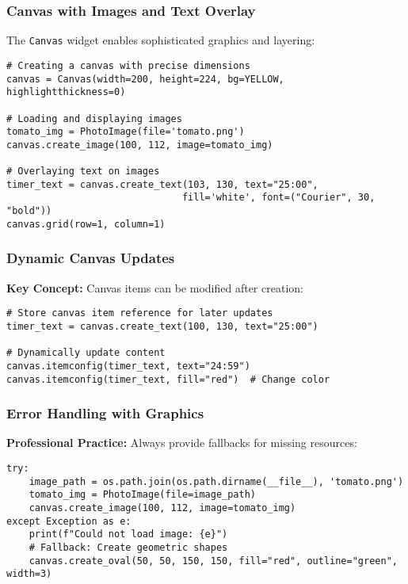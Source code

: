 \documentclass[12pt,a4paper]{article}
\begin{document}
\subsubsection{Canvas with Images and Text Overlay}
The \texttt{Canvas} widget enables sophisticated graphics and layering:

\begin{tcolorbox}[colback=blue!5!white,colframe=blue!75!black,title=Canvas with Images and Text]
\begin{lstlisting}
# Creating a canvas with precise dimensions
canvas = Canvas(width=200, height=224, bg=YELLOW, highlightthickness=0)

# Loading and displaying images
tomato_img = PhotoImage(file='tomato.png')
canvas.create_image(100, 112, image=tomato_img)

# Overlaying text on images
timer_text = canvas.create_text(103, 130, text="25:00", 
                               fill='white', font=("Courier", 30, "bold"))
canvas.grid(row=1, column=1)
\end{lstlisting}
\end{tcolorbox}

\subsubsection{Dynamic Canvas Updates}
\textbf{Key Concept:} Canvas items can be modified after creation:

\begin{lstlisting}
# Store canvas item reference for later updates
timer_text = canvas.create_text(100, 130, text="25:00")

# Dynamically update content
canvas.itemconfig(timer_text, text="24:59")
canvas.itemconfig(timer_text, fill="red")  # Change color
\end{lstlisting}

\subsubsection{Error Handling with Graphics}
\textbf{Professional Practice:} Always provide fallbacks for missing resources:

\begin{lstlisting}
try:
    image_path = os.path.join(os.path.dirname(__file__), 'tomato.png')
    tomato_img = PhotoImage(file=image_path)
    canvas.create_image(100, 112, image=tomato_img)
except Exception as e:
    print(f"Could not load image: {e}")
    # Fallback: Create geometric shapes
    canvas.create_oval(50, 50, 150, 150, fill="red", outline="green", width=3)
\end{lstlisting}
\end{document}
